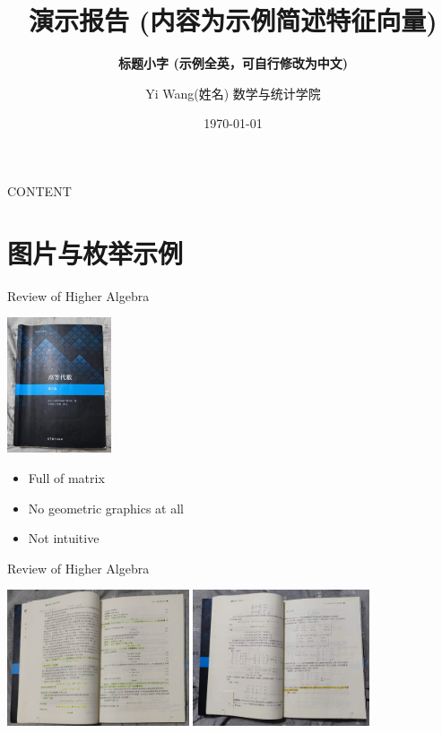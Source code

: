 \documentclass[10pt,aspectratio=43,mathserif,table]{beamer}
\title{演示报告 \quad(内容为示例简述特征向量)}
\subtitle{\fontsize{9pt}{14pt}\textbf{标题小字 \quad(示例全英，可自行修改为中文)}}
\author{Yi Wang(姓名)  \newline \newline \fontsize{6pt}{10pt}数学与统计学院}
\institute{\fontsize{6pt}{10pt}广东工业大学 \newline Guangdong University of Tech.}
\date{\today}
\begin{document}

\frame{\titlepage}

\section[CONTENT]{}   %
\begin{frame}{CONTENT}
	\tableofcontents
\end{frame}

\section{图片与枚举示例}  %

\begin{frame}{Review of Higher Algebra}
	\begin{multicols}{2}
		\includegraphics[height=4cm]{fig/gaodai_cover.jpg}
		\begin{itemize}
			\item Full of matrix
			\item No geometric graphics at all
			\item Not intuitive
		\end{itemize}
	\end{multicols}
\end{frame}
\begin{frame}{Review of Higher Algebra}
	\begin{multicols}{2}
		\includegraphics[height=4cm]{fig/gaodai.jpg}
		\includegraphics[height=4cm]{fig/gaodai_mat.jpg}
	\end{multicols}
\end{frame}
\end{document}
